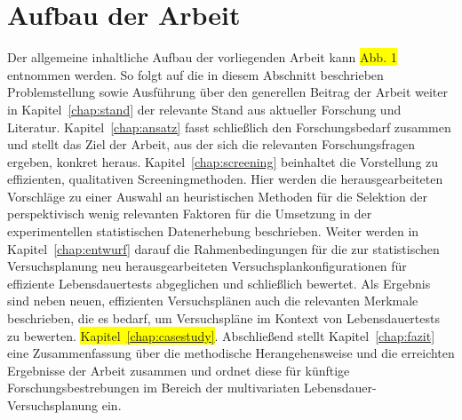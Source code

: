 \section{Aufbau der Arbeit} \label{sec:aufbau}
Der allgemeine inhaltliche Aufbau der vorliegenden Arbeit kann \colorbox{yellow}{Abb. 1} entnommen werden.
So folgt auf die in diesem Abschnitt beschrieben Problemstellung sowie Ausführung über den generellen Beitrag der Arbeit weiter in Kapitel~\ref{chap:stand} der relevante Stand aus aktueller Forschung und Literatur.
Kapitel~\ref{chap:ansatz} fasst schließlich den Forschungsbedarf zusammen und stellt das Ziel der Arbeit, aus der sich die relevanten Forschungsfragen ergeben, konkret heraus.
Kapitel~\ref{chap:screening} beinhaltet die Vorstellung zu effizienten, qualitativen Screeningmethoden.
Hier werden die herausgearbeiteten Vorschläge zu einer Auswahl an heuristischen Methoden für die Selektion der perspektivisch wenig relevanten Faktoren für die Umsetzung in der experimentellen statistischen Datenerhebung beschrieben.
Weiter werden in Kapitel~\ref{chap:entwurf} darauf die Rahmenbedingungen für die zur statistischen Versuchsplanung neu herausgearbeiteten Versuchsplankonfigurationen für effiziente Lebensdauertests abgeglichen und schließlich bewertet.
Als Ergebnis sind neben neuen, effizienten Versuchsplänen auch die relevanten Merkmale beschrieben, die es bedarf, um Versuchspläne im Kontext von Lebensdauertests zu bewerten. \colorbox{yellow}{Kapitel~\ref{chap:casestudy}}.
Abschließend stellt Kapitel~\ref{chap:fazit} eine Zusammenfassung über die methodische Herangehensweise und die erreichten Ergebnisse der Arbeit zusammen und ordnet diese für künftige Forschungsbestrebungen im Bereich der multivariaten Lebensdauer-Versuchsplanung ein.

